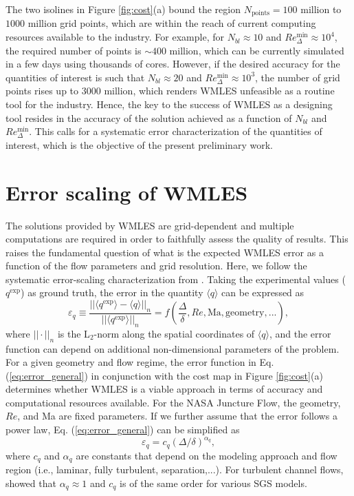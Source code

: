 \documentclass{ctr}
\begin{document}
The two isolines in Figure \ref{fig:cost}(a) bound the region
$N_\mathrm{points}=100$ million to $1000$ million grid points, which
are within the reach of current computing resources available to the
industry.  For example, for $N_{bl}\approx 10$ and
$Re_\Delta^\mathrm{min} \approx 10^4$, the required number of points
is $\sim 400$ million, which can be currently simulated in a few days
using thousands of cores. However, if the desired accuracy for the
quantities of interest is such that $N_{bl}\approx 20$ and
$Re_\Delta^\mathrm{min} \approx 10^3$, the number of grid points rises
up to $3000$ million, which renders WMLES unfeasible as a routine tool
for the industry. Hence, the key to the success of WMLES as a
designing tool resides in the accuracy of the solution achieved as a
function of $N_{bl}$ and $Re_\Delta^\mathrm{min}$. This calls for a
systematic error characterization of the quantities of interest, which
is the objective of the present preliminary work.

 \section{Error scaling of WMLES}
 \label{sec:results}

The solutions provided by WMLES are grid-dependent and multiple
computations are required in order to faithfully assess the quality of
results.  This raises the fundamental question of what is the
expected WMLES error as a function of the flow parameters and grid
resolution. Here, we follow the systematic error-scaling
characterization from \cite{Lozano2019a}. Taking the experimental
values ($q^\mathrm{exp}$) as ground truth, the error in the quantity
$\langle q \rangle$ can be expressed as
%
\begin{equation}\label{eq:error_general}
  \varepsilon_q \equiv \frac{||\langle q^\mathrm{exp}\rangle-\langle q \rangle||_n}{||\langle q^\mathrm{exp}\rangle||_n}
  = f\left( \frac{\Delta}{\delta}, Re, \mathrm{Ma},\mathrm{geometry},...\right),
\end{equation}
%
where $||\cdot||_n$ is the L$_2$-norm along the spatial coordinates of
$\langle q\rangle$, and the error function can depend on additional
non-dimensional parameters of the problem.  For a given geometry and
flow regime, the error function in Eq. (\ref{eq:error_general}) in
conjunction with the cost map in Figure \ref{fig:cost}(a) determines
whether WMLES is a viable approach in terms of accuracy and
computational resources available. For the NASA Juncture Flow, the
geometry, $Re$, and Ma are fixed parameters. If we further assume that
the error follows a power law, Eq. (\ref{eq:error_general}) can be
simplified as
%
\begin{equation}\label{eq:error_simply}
\varepsilon_q = c_q \left( \Delta/\delta \right)^{\alpha_q},
\end{equation}
%
where $c_q$ and $\alpha_q$ are constants that depend on the modeling
approach and flow region (i.e., laminar, fully turbulent,
separation,...). For turbulent channel flows, \cite{Lozano2019a}
showed that $\alpha_q \approx 1$ and $c_q$ is of the same order for
various SGS models.
\end{document}
